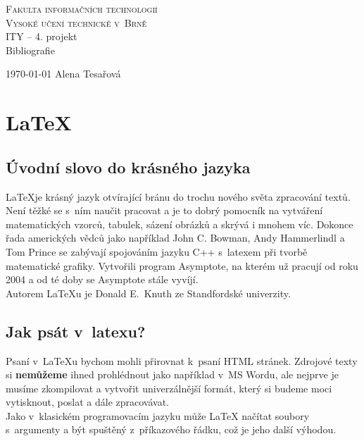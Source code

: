 \documentclass[11pt,a4paper]{article}
\author{Alena Tesařová}
\begin{document}
\begin{titlepage}

\begin{center}
\Huge
\textsc{Fakulta informačních technologií\\
Vysoké učení technické v~Brně}\\
\LARGE ITY -- 4. projekt\\
\medskip
{\Huge Bibliografie}
\end{center}
{\Large \today \hfill
Alena Tesařová}
\end{titlepage}


\section{\LaTeX}

\subsection{Úvodní slovo do krásného jazyka}
\LaTeX je krásný jazyk otvírající bránu do trochu nového světa zpracování textů. Není těžké se s~ním naučit pracovat a je to dobrý pomocník na vytváření matematických vzorců, tabulek, sázení obrázků a skrývá i mnohem víc. Dokonce řada amerických vědců jako například John C. Bowman, Andy Hammerlindl a Tom Prince se zabývají spojováním jazyku C++ s~latexem při tvorbě matematické grafiky. Vytvořili program Asymptote, na kterém už pracují od roku 2004 a od té doby se Asymptote stále vyvíjí. \cite{gstug:matknihovna} \\
Autorem LaTeXu je Donald E.~Knuth ze Standfordské univerzity. \cite{Rybicka:Latex_pro_zacatecniky}


\subsection{Jak psát v~latexu?}
Psaní v~LaTeXu bychom mohli přirovnat k~psaní HTML stránek. Zdrojové texty si \textbf{nemůžeme} ihned prohlédnout jako například v~MS Wordu, ale nejprve je musíme zkompilovat a vytvořit univerzálnější formát, který si budeme moci vytisknout, poslat a dále zpracovávat. \cite{Hordejcuk:Latex} \\
Jako v~klasickém programovacím jazyku může LaTeX načítat soubory s~argumenty a být spuštěný z~příkazového řádku, což je jeho další výhodou. \cite{gstug:spousteni}
\end{document}
